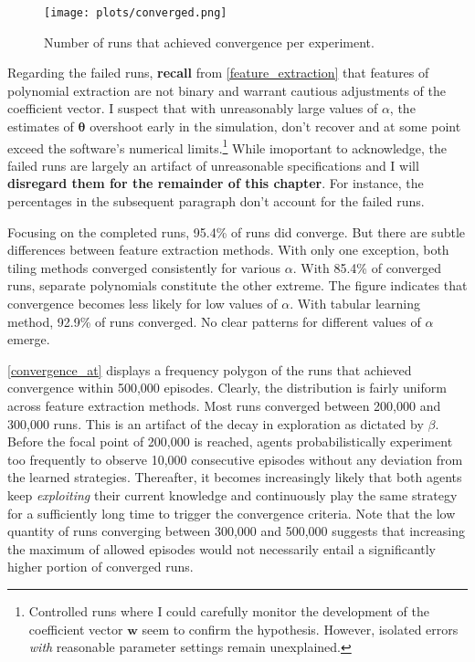 \begin{figure}
	\texttt{[image: plots/converged.png]}
	\caption{Number of runs that achieved convergence per experiment.}
	\label{converged}
\end{figure}

Regarding the failed runs, \textbf{recall} from \autoref{feature_extraction} that features of polynomial extraction are not binary and warrant cautious adjustments of the coefficient vector. I suspect that with unreasonably large values of $\alpha$, the estimates of $\boldsymbol{\theta}$ overshoot early in the simulation, don't recover and at some point exceed the software's numerical limits.\footnote{Controlled runs where I could carefully monitor the development of the coefficient vector $\boldsymbol{w}$ seem to confirm the hypothesis. However, isolated errors \emph{with} reasonable parameter settings remain unexplained.} While imoportant to acknowledge, the failed runs are largely an artifact of unreasonable specifications and I will \textbf{disregard them for the remainder of this chapter}. For instance, the percentages in the subsequent paragraph don't account for the failed runs.

Focusing on the completed runs, 95.4\% of runs did converge. But there are subtle differences between feature extraction methods. With only one exception, both tiling methods converged consistently for various $\alpha$. With 85.4\% of converged runs, separate polynomials constitute the other extreme. The figure indicates that convergence becomes less likely for low values of $\alpha$. With tabular learning method, 92.9\% of runs converged. No clear patterns for different values of $\alpha$ emerge.

\autoref{convergence_at} displays a frequency polygon of the runs that achieved convergence within 500,000 episodes. Clearly, the distribution is fairly uniform across feature extraction methods. Most runs converged between 200,000 and 300,000 runs. This is an artifact of the decay in exploration as dictated by $\beta$. Before the focal point of 200,000 is reached, agents probabilistically experiment too frequently to observe 10,000 consecutive episodes without any deviation from the learned strategies. Thereafter, it becomes increasingly likely that both agents keep \emph{exploiting} their current knowledge and continuously play the same strategy for a sufficiently long time to trigger the convergence criteria. Note that the low quantity of runs converging between 300,000 and 500,000 suggests that increasing the maximum of allowed episodes would not necessarily entail a significantly higher portion of converged runs.

